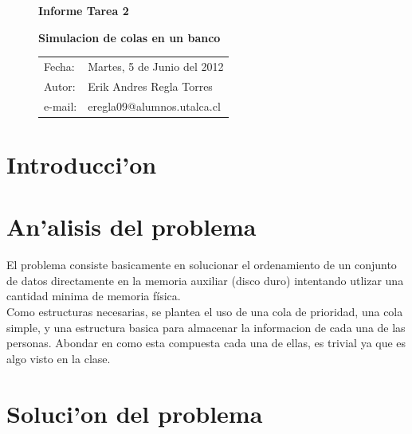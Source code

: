 \documentclass[11pt]{utalcaDoc}
\begin{document}

\begin{figure}[H]
%
%
%

\vspace{8cm}

\centerline{\huge \bf Informe Tarea 2}
\vspace{0.8cm}
\centerline{\Large \bf Simulacion de colas en un banco}

\vspace{8cm}

\hfill \begin{tabular}{ll}
Fecha:  & Martes, 5 de Junio del 2012\\
Autor:  & Erik Andres Regla Torres\\
e-mail: & eregla09@alumnos.utalca.cl

\end{tabular}

\label{fig1}
\end{figure}

\section{Introducci'on}

\section{An'alisis del problema} El problema consiste basicamente en solucionar el ordenamiento de un conjunto de datos directamente en la memoria auxiliar (disco duro) intentando utlizar una cantidad minima de memoria física.\\

Como estructuras necesarias, se plantea el uso de una cola de prioridad, una cola simple, y una estructura basica para almacenar la informacion de cada una de las personas. Abondar en como esta compuesta cada una de ellas, es trivial ya que es algo visto en la clase.\\

\section{Soluci'on del problema}
\end{document}
